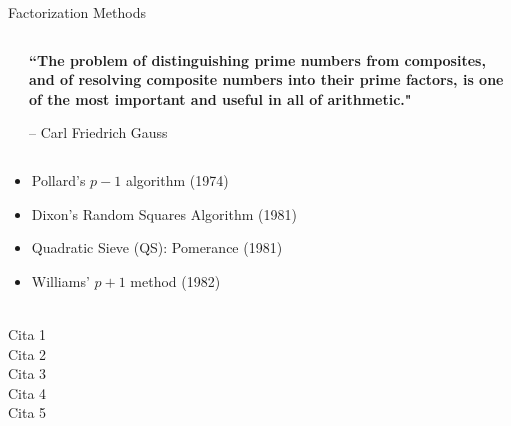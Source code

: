 \documentclass[
	11pt, %
]{beamer}
\begin{document}
\begin{frame}{Factorization Methods}
  
  \begin{columns}[t]
    \begin{column}{.3\textwidth}
    \end{column}
    \begin{column}{.7\textwidth}
      \textbf{``The problem of distinguishing prime numbers from composites, and of resolving composite numbers into their prime factors, is one of the most important and useful in all of arithmetic."}
      
      \hfill-- Carl Friedrich Gauss
    \end{column}
  \end{columns}
  \vspace*{10pt}
  
  \begin{itemize}
  \item Pollard's $p-1$ algorithm (1974)
    \vspace*{10pt}
  \item Dixon's Random Squares Algorithm (1981)
    \vspace*{10pt}
  \item Quadratic Sieve (QS): Pomerance (1981)
    \vspace*{10pt}
  \item Williams' $p+1$ method (1982)
  \end{itemize}
\end{frame}

\begin{frame}
  \raisebox{-4ex}{$\to$}%
  \raisebox{-4ex}{$\to$}%
  \obeylines\\
  Cita 1 \citep{james}\\
  Cita 2 \citet*{8478368}\\
  Cita 3 \cite{8478368}\\
  Cita 4 \citet{8478368}\\
  Cita 5 \citet[chap.~2]{8478368}\\
  \citep[chap.~2]{james}\\
  \citep[see][]{james}\\
  \citep[see][chap.~2]{james}\\
  \citep*{james}\\
  \citet{8478368,james}\\
  \citealp*{james}
\end{frame}
\end{document}
